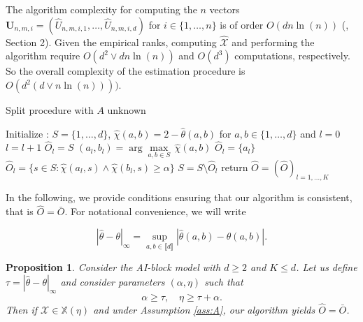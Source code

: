 \documentclass[11pt]{article}
\newtheorem{proposition}{Proposition}
\theoremstyle{definition}
\begin{document}
	The algorithm complexity for computing the $n$ vectors $\textbf{U}_{n,m,i} = (\hat{U}_{n,m,i,1}, \dots, \hat{U}_{n,m,i,d})$ for $i \in \{1,\dots,n\}$ is of order $O(dn \ln(n))$ (\cite{cormen2022introduction}, Section 2). Given the empirical ranks, computing $\hat{\mathcal{X}}$ and performing the algorithm require $O(d^2\vee d n \ln(n))$ and $O(d^3)$ computations, respectively. So the overall complexity of the estimation procedure is $O(d^2 (d \vee  n \ln (n))))$.
	\begin{algorithm}
	
	\caption{Split procedure with $A$ unknown}

\begin{algorithmic}[1]
    \State Initialize : $S = \{1,\dots,d\}$, $\hat{\chi}(a,b) = 2 - \hat{\theta}(a,b)$ for $a,b \in \{1,\dots,d\}$ and $l = 0$
    		\State $l = l +1$
    			\State $\hat{O}_l = S$
    		\EndIf
    			\State $(a_l, b_l) = \arg \underset{a,b \in S}{\max} \, \hat{\chi}(a,b)$
    				\State $\hat{O}_l = \{a_l\}$
    			\EndIf
    				\State $\hat{O}_l = \{ s \in S : \hat{\chi}(a_l,s) \wedge \hat{\chi}(b_l,s) \geq \alpha \}$
    			\EndIf
    		\EndIf
    		\State $S = S \setminus \hat{O}_l$
    	\EndWhile
    \State return $\hat{O} = (\hat{O})_{l = 1, \dots,K}$
\EndProcedure
\end{algorithmic}
\label{alg:rec_pratic}
\end{algorithm}

	In the following, we provide conditions ensuring that our algorithm is consistent, that is $\hat{O} = \bar{O}$. For notational convenience, we will write
	
	\begin{equation*}
		|\hat{\theta} - \theta |_{\infty} = \underset{a,b \in \llbracket d \rrbracket}{\sup} |\hat{\theta}(a,b) - \theta(a,b)|.
	\end{equation*}
	
	\begin{proposition}
		\label{prop:exact_recovery}
		Consider the AI-block model with $d \geq 2$ and $K \leq d$. Let us define $\tau = |\hat{\theta} - \theta|_{\infty}$ and consider parameters $(\alpha, \eta)$ such that
		\begin{equation}
			\label{eq:condition_consistent_recovery}
			\alpha \geq \tau, \quad \eta \geq \tau + \alpha.
		\end{equation}
		Then if $\mathcal{X} \in \mathbb{X}(\eta)$ and under Assumption \ref{ass:A}, our algorithm yields $\hat{O} = \bar{O}$.
	\end{proposition}
	
\end{document}
